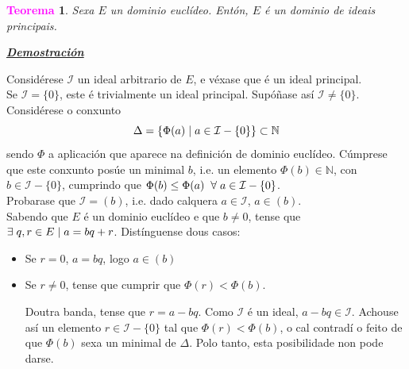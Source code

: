 \documentclass[twoside]{report}
\newcommand{\magbf}[1]{\textcolor{magenta}{\textbf{#1}}} %
\theoremstyle{mystyle}
\newtheorem{theo}{\magbf{Teorema}}[chapter]
\newenvironment{theorem}
{\begin{mdframed}[linecolor = magenta,backgroundcolor = classicrose, linewidth = 2mm]\begin{theo}}
{\end{theo}\end{mdframed}}
\begin{document}
\begin{theorem} \label{th2.7}
Sexa $E$ un dominio euclídeo. Entón, $E$ é un dominio de ideais principais.
\end{theorem}

\vspace{2mm}

\noindent \textbf{\textit{\underline{Demostración}}}

\vspace{2mm}

\noindent Considérese $\mathcal{I}$ un ideal arbitrario de $E$, e véxase que é un ideal principal.\\

\noindent Se $\mathcal{I} = \{0\}$, este é trivialmente un ideal principal. Supóñase así $\mathcal{I} \neq \{0\}$. Considérese o conxunto $$\Delta = \{\Phi(a) \hspace{1mm} | \hspace{1mm} a \in \mathcal{I} - \{0\}\} \subset \mathbb{N}$$
\noindent sendo $\Phi$ a aplicación que aparece na definición de dominio euclídeo. Cúmprese que este conxunto posúe un minimal $b$, i.e. un elemento $\Phi(b) \in \mathbb{N}$, con $b \in \mathcal{I} - \{0\}$, cumprindo que $\Phi(b) \leq \Phi(a) \hspace{2mm} \forall \hspace{1mm} a \in \mathcal{I}-\{0\}$.\\

\noindent Probarase que $\mathcal{I} = (b)$, i.e. dado calquera $a \in \mathcal{I}$, $a \in (b)$.\\

\noindent Sabendo que $E$ é un dominio euclídeo e que $b \neq 0$, tense que $\exists \hspace{1mm} q,r \in E \hspace{1mm} | \hspace{1mm} a = bq + r$. Distínguense dous casos:

\begin{itemize}
    \item Se $r = 0$, $a = bq$, logo $a \in (b)$
    \item Se $r \neq 0$, tense que cumprir que $\Phi(r) < \Phi(b)$. 
    
    Doutra banda, tense que $r = a - bq$. Como $\mathcal{I}$ é un ideal, $a - bq \in \mathcal{I}$. Achouse así un elemento $r \in \mathcal{I} - \{0\}$ tal que $\Phi(r) < \Phi(b)$, o cal contradí o feito de que $\Phi(b)$ sexa un minimal de $\Delta$. Polo tanto, esta posibilidade non pode darse.
\end{itemize}
\end{document}
